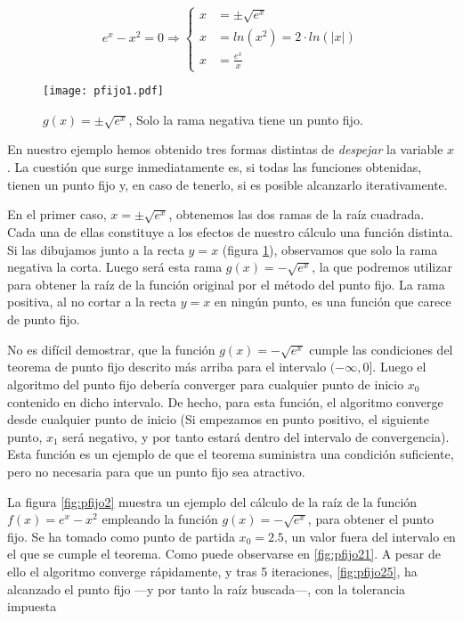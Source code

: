 \begin{equation*}
e^x-x^2=0 \Rightarrow \left\{
\begin{aligned}
x&=\pm  \sqrt{e^x}\\
x&= ln(x^2)=2\cdot ln(\vert x \vert)\\
x&=\frac{e^x}{x} 
\end{aligned} 
\right.
\end{equation*}

\begin{figure}[h]
\texttt{[image: pfijo1.pdf]}
\caption{$g(x)=\pm \sqrt{e^x}$, Solo la rama negativa tiene un punto fijo.}
\label{fig:pfijo01}
\end{figure}

En nuestro ejemplo hemos obtenido tres formas distintas de \emph{despejar} la variable $x$. La cuestión que surge inmediatamente es, si todas las funciones obtenidas, tienen un punto fijo y, en caso de tenerlo, si es posible alcanzarlo iterativamente.

En el primer caso, $x=\pm \sqrt{e^x}$, obtenemos las dos ramas de la raíz cuadrada. Cada una de ellas constituye a los efectos de nuestro cálculo una función distinta. Si las dibujamos junto a la recta $y=x$ (figura \ref{fig:pfijo01}), observamos que solo la rama negativa la corta. Luego será  esta rama $g(x)=-\sqrt{e^x}$,  la que podremos utilizar para obtener la raíz de la función original por el método del punto fijo. La rama positiva, al no cortar a la recta $y=x$ en ningún punto, es una función que carece de punto fijo.

No es difícil demostrar, que la función $g(x)=-\sqrt{e^x} $ cumple las condiciones del teorema de punto fijo descrito más arriba para el intervalo $(-\infty, 0]$. Luego el algoritmo del punto fijo debería converger para cualquier punto de inicio $x_0$ contenido en dicho intervalo. De hecho, para esta función, el algoritmo converge desde cualquier punto de inicio (Si empezamos en punto positivo, el siguiente punto, $x_1$ será negativo, y por tanto estará dentro del intervalo de convergencia). Esta función es un ejemplo de que el teorema suministra una condición suficiente, pero no necesaria para que un punto fijo sea atractivo. 

La figura \ref{fig:pfijo2} muestra un ejemplo del cálculo de la raíz de la función $f(x)=e^x-x^2$ empleando la función $g(x)=-\sqrt{e^x}$, para obtener el punto fijo. Se ha tomado como punto de partida $x_0=2.5$, un valor fuera del intervalo en el que se cumple el teorema. Como puede observarse en \ref{fig:pfijo21}. A pesar de ello el algoritmo converge rápidamente, y tras 5 iteraciones, \ref{fig:pfijo25}, ha alcanzado el punto fijo ---y por tanto la raíz buscada---, con la tolerancia impuesta
  
